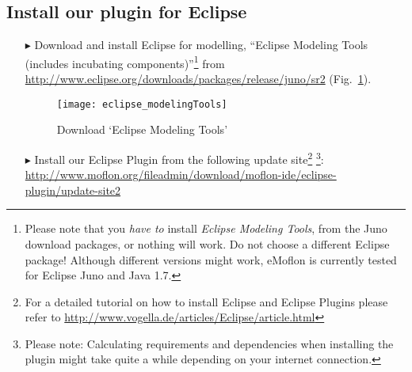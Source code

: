 \genHeader
{}

\subsection{Install our plugin for Eclipse}
 
 \vspace{0.5cm}
 
\begin{itemize}
\item[$\blacktriangleright$] Download\hypertarget{installPlugin common}{} and install Eclipse for modelling, ``Eclipse Modeling Tools (includes incubating
components)''\footnote{Please note that you \emph{have to} install \emph{Eclipse Modeling Tools}, from the Juno download packages, or nothing will work.  Do not
choose a different Eclipse package!  Although different versions might work, eMoflon is currently tested for Eclipse Juno and Java 1.7.} from
\url{http://www.eclipse.org/downloads/packages/release/juno/sr2} (Fig.~\ref{fig_downloadModelingPackage}).

\vspace{1.5cm}

\begin{figure}[htbp]
	\centering
  	\texttt{[image: eclipse\_modelingTools]}
	\caption{Download `Eclipse Modeling Tools'}
	\label{fig_downloadModelingPackage}
\end{figure}

\vspace{1cm}

\item[$\blacktriangleright$] Install our Eclipse Plugin from the following update site\footnote{For a detailed tutorial on how to install Eclipse and Eclipse
Plugins please refer to \url{http://www.vogella.de/articles/Eclipse/article.html}} \footnote{Please note: Calculating requirements and dependencies when
installing the plugin might take quite a while depending on your internet connection.}:
\url{http://www.moflon.org/fileadmin/download/moflon-ide/eclipse-plugin/update-site2}

\end{itemize}
